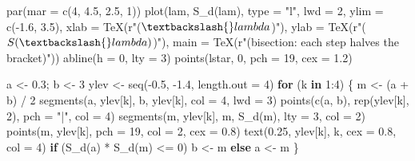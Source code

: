 \documentclass[
  letterpaper,
  DIV=11,
  numbers=noendperiod]{scrreprt}
\newenvironment{Shaded}{\begin{snugshade}}{\end{snugshade}}
\newcommand{\AttributeTok}[1]{\textcolor[rgb]{0.40,0.45,0.13}{#1}}
\newcommand{\ControlFlowTok}[1]{\textcolor[rgb]{0.00,0.23,0.31}{\textbf{#1}}}
\newcommand{\DecValTok}[1]{\textcolor[rgb]{0.68,0.00,0.00}{#1}}
\newcommand{\FloatTok}[1]{\textcolor[rgb]{0.68,0.00,0.00}{#1}}
\newcommand{\FunctionTok}[1]{\textcolor[rgb]{0.28,0.35,0.67}{#1}}
\newcommand{\NormalTok}[1]{\textcolor[rgb]{0.00,0.23,0.31}{#1}}
\newcommand{\OtherTok}[1]{\textcolor[rgb]{0.00,0.23,0.31}{#1}}
\newcommand{\SpecialCharTok}[1]{\textcolor[rgb]{0.37,0.37,0.37}{#1}}
\newcommand{\StringTok}[1]{\textcolor[rgb]{0.13,0.47,0.30}{#1}}
\begin{document}
\begin{Shaded}
\begin{Highlighting}[]
\FunctionTok{par}\NormalTok{(}\AttributeTok{mar =} \FunctionTok{c}\NormalTok{(}\DecValTok{4}\NormalTok{, }\FloatTok{4.5}\NormalTok{, }\FloatTok{2.5}\NormalTok{, }\DecValTok{1}\NormalTok{))}
\FunctionTok{plot}\NormalTok{(lam, }\FunctionTok{S\_d}\NormalTok{(lam), }\AttributeTok{type =} \StringTok{"l"}\NormalTok{, }\AttributeTok{lwd =} \DecValTok{2}\NormalTok{, }\AttributeTok{ylim =} \FunctionTok{c}\NormalTok{(}\SpecialCharTok{{-}}\FloatTok{1.6}\NormalTok{, }\FloatTok{3.5}\NormalTok{),}
     \AttributeTok{xlab =} \FunctionTok{TeX}\NormalTok{(r}\StringTok{"($\textbackslash{}lambda$)"}\NormalTok{), }\AttributeTok{ylab =} \FunctionTok{TeX}\NormalTok{(r}\StringTok{"($S(\textbackslash{}lambda)$)"}\NormalTok{),}
     \AttributeTok{main =} \FunctionTok{TeX}\NormalTok{(r}\StringTok{"(bisection: each step halves the bracket)"}\NormalTok{))}
\FunctionTok{abline}\NormalTok{(}\AttributeTok{h =} \DecValTok{0}\NormalTok{, }\AttributeTok{lty =} \DecValTok{3}\NormalTok{)}
\FunctionTok{points}\NormalTok{(lstar, }\DecValTok{0}\NormalTok{, }\AttributeTok{pch =} \DecValTok{19}\NormalTok{, }\AttributeTok{cex =} \FloatTok{1.2}\NormalTok{)}

\NormalTok{a }\OtherTok{\textless{}{-}} \FloatTok{0.3}\NormalTok{; b }\OtherTok{\textless{}{-}} \DecValTok{3}
\NormalTok{ylev }\OtherTok{\textless{}{-}} \FunctionTok{seq}\NormalTok{(}\SpecialCharTok{{-}}\FloatTok{0.5}\NormalTok{, }\SpecialCharTok{{-}}\FloatTok{1.4}\NormalTok{, }\AttributeTok{length.out =} \DecValTok{4}\NormalTok{)}
\ControlFlowTok{for}\NormalTok{ (k }\ControlFlowTok{in} \DecValTok{1}\SpecialCharTok{:}\DecValTok{4}\NormalTok{) \{}
\NormalTok{  m }\OtherTok{\textless{}{-}}\NormalTok{ (a }\SpecialCharTok{+}\NormalTok{ b) }\SpecialCharTok{/} \DecValTok{2}
  \FunctionTok{segments}\NormalTok{(a, ylev[k], b, ylev[k], }\AttributeTok{col =} \DecValTok{4}\NormalTok{, }\AttributeTok{lwd =} \DecValTok{3}\NormalTok{)}
  \FunctionTok{points}\NormalTok{(}\FunctionTok{c}\NormalTok{(a, b), }\FunctionTok{rep}\NormalTok{(ylev[k], }\DecValTok{2}\NormalTok{), }\AttributeTok{pch =} \StringTok{"|"}\NormalTok{, }\AttributeTok{col =} \DecValTok{4}\NormalTok{)}
  \FunctionTok{segments}\NormalTok{(m, ylev[k], m, }\FunctionTok{S\_d}\NormalTok{(m), }\AttributeTok{lty =} \DecValTok{3}\NormalTok{, }\AttributeTok{col =} \DecValTok{2}\NormalTok{)}
  \FunctionTok{points}\NormalTok{(m, ylev[k], }\AttributeTok{pch =} \DecValTok{19}\NormalTok{, }\AttributeTok{col =} \DecValTok{2}\NormalTok{, }\AttributeTok{cex =} \FloatTok{0.8}\NormalTok{)}
  \FunctionTok{text}\NormalTok{(}\FloatTok{0.25}\NormalTok{, ylev[k], k, }\AttributeTok{cex =} \FloatTok{0.8}\NormalTok{, }\AttributeTok{col =} \DecValTok{4}\NormalTok{)}
  \ControlFlowTok{if}\NormalTok{ (}\FunctionTok{S\_d}\NormalTok{(a) }\SpecialCharTok{*} \FunctionTok{S\_d}\NormalTok{(m) }\SpecialCharTok{\textless{}=} \DecValTok{0}\NormalTok{) b }\OtherTok{\textless{}{-}}\NormalTok{ m }\ControlFlowTok{else}\NormalTok{ a }\OtherTok{\textless{}{-}}\NormalTok{ m}
\NormalTok{\}}
\end{Highlighting}
\end{Shaded}
\end{document}
